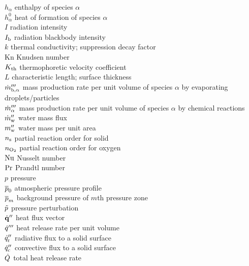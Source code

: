 \begin{tabbing}
$h_\alpha$                \> enthalpy of species $\alpha$   \\
$h_\alpha^0$              \> heat of formation of species $\alpha$   \\
$I$                       \> radiation intensity   \\
$I_{\rm b}$               \> radiation blackbody intensity   \\
$k$                       \> thermal conductivity; suppression decay factor \\
Kn                        \> Knudsen number \\
$K_{\rm th}$              \> thermophoretic velocity coefficient \\
$L$                       \> characteristic length; surface thickness \\
$\dot{m}_{{\rm b},\alpha}'''$ \> mass production rate per unit volume of species $\alpha$ by evaporating droplets/particles \\
$\dot{m}_\alpha'''$           \> mass production rate per unit volume of species $\alpha$ by chemical reactions \\
$\dot{m}_{\rm w}''$           \> water mass flux  \\
$m_{\rm w}''$             \> water mass per unit area \\
$n_{\rm s}$               \> partial reaction order for solid \\
$n_{\rm O_2}$             \> partial reaction order for oxygen \\
$\hbox{Nu}$                     \> Nusselt number \\
$\hbox{Pr}$                     \> Prandtl number \\
$p$                       \> pressure \\
$\overline{p}_0$                   \> atmospheric pressure profile \\
$\overline{p}_m$                   \> background pressure of $m$th pressure zone \\
$\tilde{p}$                     \> pressure perturbation \\
$\dot{\mathbf{q}}''$                  \> heat flux vector \\
$\dot{q}'''$                  \> heat release rate per unit volume \\
$\dot{q}_{\rm r}''$           \> radiative flux to a solid surface \\
$\dot{q}_{\rm c}''$           \> convective flux to a solid surface \\
$\dot{Q}$                     \> total heat release rate \\

\end{tabbing}
